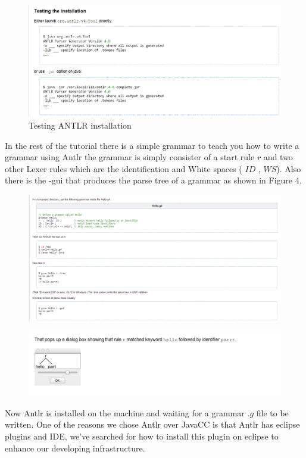 \documentclass[a4paper]{article}
\begin{document}
$$ $$
\begin{figure}[ht]
\includegraphics[width =\paperwidth]{2.png} 
\caption{Testing ANTLR installation}
\end{figure}
$$ $$
\newpage
In the rest of the tutorial there is a simple grammar to teach you how to write a grammar using Antlr the grammar is simply consister of a start rule $r$ and two other Lexer rules which are the identification and White spaces ( $ID$ , $WS$). Also there is the -gui that produces the parse tree of a grammar as shown in Figure 4.
$$ $$
\begin{figure}[ht]
\includegraphics[width = \paperwidth]{3.png} 
\caption{}
\end{figure}
\newline 
\begin{figure}[ht]
\includegraphics[width = \paperwidth]{4.png} 
\caption{}
\end{figure}
$$ $$
Now Antlr is installed on the machine and waiting for a grammar $.g$ file to be written. One of the reasons we chose Antlr over JavaCC is that Antlr has eclipse plugins and IDE, we've searched for how to install this plugin on eclipse to enhance our developing infrastructure.
\end{document}
